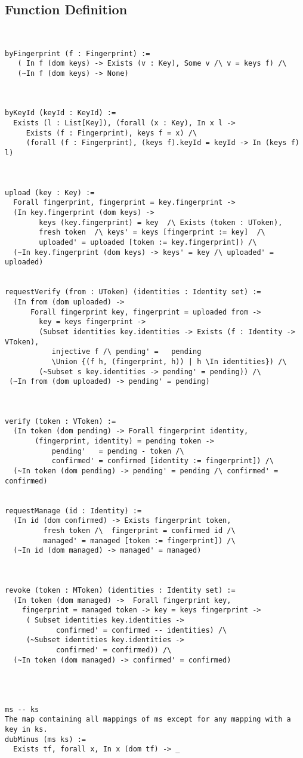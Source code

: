 \documentclass{article}
\begin{document}
\subsection{Function Definition}
\begin{verbatim}


byFingerprint (f : Fingerprint) := 
   ( In f (dom keys) -> Exists (v : Key), Some v /\ v = keys f) /\ 
   (~In f (dom keys) -> None) 
 


byKeyId (keyId : KeyId) :=
  Exists (l : List[Key]), (forall (x : Key), In x l -> 
     Exists (f : Fingerprint), keys f = x) /\
     (forall (f : Fingerprint), (keys f).keyId = keyId -> In (keys f) l)
      


upload (key : Key) := 
  Forall fingerprint, fingerprint = key.fingerprint -> 
  (In key.fingerprint (dom keys) -> 
        keys (key.fingerprint) = key  /\ Exists (token : UToken), 
        fresh token  /\ keys' = keys [fingerprint := key]  /\
        uploaded' = uploaded [token := key.fingerprint]) /\
  (~In key.fingerprint (dom keys) -> keys' = key /\ uploaded' = uploaded)  
         
        
requestVerify (from : UToken) (identities : Identity set) :=
  (In from (dom uploaded) -> 
      Forall fingerprint key, fingerprint = uploaded from -> 
        key = keys fingerprint -> 
        (Subset identities key.identities -> Exists (f : Identity -> VToken), 
           injective f /\ pending' =   pending 
           \Union {(f h, (fingerprint, h)) | h \In identities}) /\
        (~Subset s key.identities -> pending' = pending)) /\
 (~In from (dom uploaded) -> pending' = pending)



verify (token : VToken) :=
  (In token (dom pending) -> Forall fingerprint identity,
       (fingerprint, identity) = pending token -> 
           pending'   = pending - token /\        
           confirmed' = confirmed [identity := fingerprint]) /\
  (~In token (dom pending) -> pending' = pending /\ confirmed' = confirmed)


requestManage (id : Identity) :=
  (In id (dom confirmed) -> Exists fingerprint token, 
         fresh token /\  fingerprint = confirmed id /\
         managed' = managed [token := fingerprint]) /\
  (~In id (dom managed) -> managed' = managed)
   


revoke (token : MToken) (identities : Identity set) :=
  (In token (dom managed) ->  Forall fingerprint key,  
    fingerprint = managed token -> key = keys fingerprint -> 
     ( Subset identities key.identities ->  
            confirmed' = confirmed -- identities) /\
     (~Subset identities key.identities -> 
            confirmed' = confirmed)) /\
  (~In token (dom managed) -> confirmed' = confirmed)




ms -- ks 	
The map containing all mappings of ms except for any mapping with a key in ks.
dubMinus (ms ks) := 
  Exists tf, forall x, In x (dom tf) -> _ 
  

    

\end{verbatim}
\end{document}
